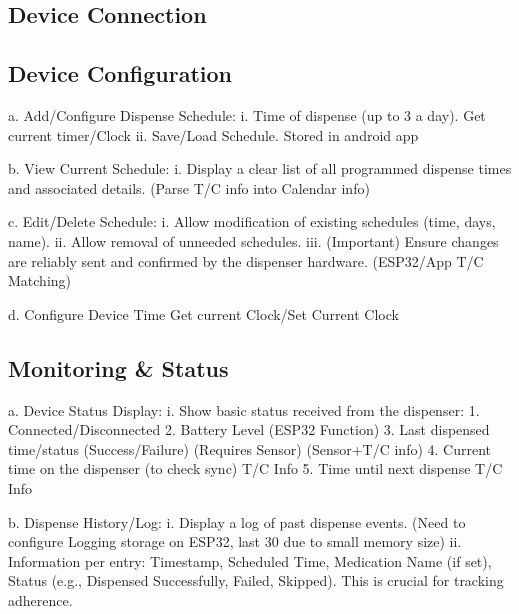\subsection{Device Connection}

\subsection{Device Configuration}
  a. Add/Configure Dispense Schedule:
  i. Time of dispense (up to 3 a day). Get current timer/Clock
  ii. Save/Load Schedule. Stored in android app
  
  b. View Current Schedule:
  i. Display a clear list of all programmed dispense times and associated details. (Parse T/C info into Calendar info)
  
  c. Edit/Delete Schedule:
  i. Allow modification of existing schedules (time, days, name).
  ii. Allow removal of unneeded schedules.
  iii. (Important) Ensure changes are reliably sent and confirmed by the dispenser hardware. (ESP32/App T/C Matching)
  
  d. Configure Device Time Get current Clock/Set Current Clock
  
\subsection{Monitoring \&  Status}

a. Device Status Display:
i. Show basic status received from the dispenser:
1. Connected/Disconnected
2. Battery Level (ESP32 Function)
3. Last dispensed time/status (Success/Failure) (Requires Sensor) (Sensor+T/C info)
4. Current time on the dispenser (to check sync) T/C Info
5. Time until next dispense T/C Info

b. Dispense History/Log:
i. Display a log of past dispense events. (Need to configure Logging storage on ESP32, last 30 due to small memory size)
ii. Information per entry: Timestamp, Scheduled Time, Medication Name (if set), Status (e.g., Dispensed Successfully, Failed, Skipped). This is crucial for tracking adherence.
